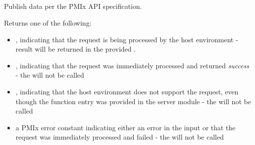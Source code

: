 \subsection{}

\summary

Publish data per the PMIx API specification.

\format


\begin{arglist}
\end{arglist}

Returns one of the following:

\begin{itemize}
    \item {}, indicating that the request is being processed by the host environment - result will be returned in the provided .
    \item {}, indicating that the request was immediately processed and returned \textit{success} - the  will not be called
    \item {}, indicating that the host environment does not support the request, even though the function entry was provided in the server module - the  will not be called
    \item a PMIx error constant indicating either an error in the input or that the request was immediately processed and failed - the  will not be called
\end{itemize}

